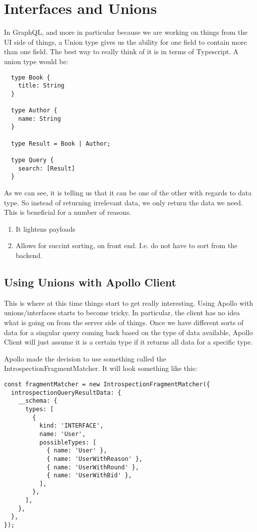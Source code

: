\chapter{ Interfaces and Unions }

In GraphQL, and more in particular because we are working on things from the UI side of things, a Union type gives us the ability for one field to contain more than one field. The best way to really think of it is in terms of Typescript. A union type would be:
\begin{lstlisting}
  type Book {
    title: String
  }

  type Author {
    name: String
  }

  type Result = Book | Author;

  type Query {
    search: [Result]
  }
\end{lstlisting}

As we can see, it is telling us that it can be one of the other with regards to data type. So instead of returning irrelevant data, we only return the data we need. This is beneficial for a number of reasons.
\begin{enumerate}
  \item It lightens payloads
  \item Allows for succint sorting, on front end. I.e. do not have to sort from the backend.
\end{enumerate}

\section{ Using Unions with Apollo Client }
This is where at this time things start to get really interesting. Using Apollo with unions/interfaces starts to become tricky. In particular, the client has no idea what is going on from the server side of things. Once we have different sorts of data for a singular query coming back based on the type of data available, Apollo Client will just assume it is a certain type if it returns all data for a specific type.

Apollo made the decision to use something called the IntrospectionFragmentMatcher. It will look something like this:
\begin{lstlisting}
const fragmentMatcher = new IntrospectionFragmentMatcher({
  introspectionQueryResultData: {
    __schema: {
      types: [
        {
          kind: 'INTERFACE',
          name: 'User',
          possibleTypes: [
            { name: 'User' },
            { name: 'UserWithReason' },
            { name: 'UserWithRound' },
            { name: 'UserWithBid' },
          ],
        },
      ],
    },
  },
});
\end{lstlisting}

